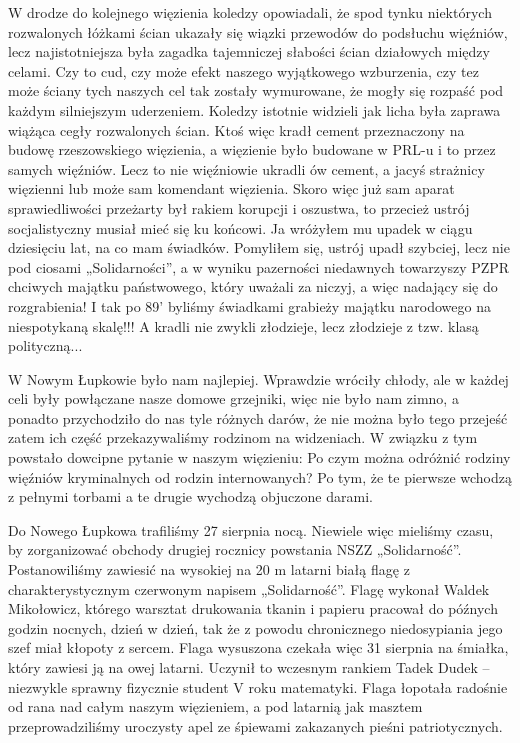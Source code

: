W drodze do kolejnego więzienia koledzy opowiadali, że spod tynku niektórych rozwalonych łóżkami ścian ukazały się wiązki przewodów do podsłuchu więźniów, lecz najistotniejsza była zagadka tajemniczej słabości ścian działowych między celami. Czy to cud, czy może efekt naszego wyjątkowego wzburzenia, czy tez może ściany tych naszych cel tak zostały wymurowane, że mogły się rozpaść pod każdym silniejszym uderzeniem. Koledzy istotnie widzieli jak licha była zaprawa wiążąca cegły rozwalonych ścian. Ktoś więc kradł cement przeznaczony na budowę rzeszowskiego więzienia, a więzienie było budowane w PRL-u i to przez samych więźniów. Lecz to nie więźniowie ukradli ów cement, a jacyś strażnicy więzienni lub może sam komendant więzienia. Skoro więc już sam aparat sprawiedliwości przeżarty był rakiem korupcji i oszustwa, to przecież ustrój socjalistyczny musiał mieć się ku końcowi. Ja wróżyłem mu upadek w ciągu dziesięciu lat, na co mam świadków. Pomyliłem się, ustrój upadł szybciej, lecz nie pod ciosami „Solidarności”, a w wyniku pazerności niedawnych towarzyszy PZPR chciwych majątku państwowego, który uważali za niczyj, a więc nadający się do rozgrabienia! I tak po 89’ byliśmy świadkami grabieży majątku narodowego na niespotykaną skalę!!! A kradli nie zwykli złodzieje, lecz złodzieje z tzw. klasą polityczną...

W Nowym Łupkowie było nam najlepiej. Wprawdzie wróciły chłody, ale w każdej celi były powłączane nasze domowe grzejniki, więc nie było nam zimno, a ponadto przychodziło do nas tyle różnych darów, że nie można było tego przejeść zatem ich część przekazywaliśmy rodzinom na widzeniach. W związku z tym powstało dowcipne pytanie w naszym więzieniu: Po czym można odróżnić rodziny więźniów kryminalnych od rodzin internowanych? Po tym, że te pierwsze wchodzą z pełnymi torbami a te drugie wychodzą objuczone darami.

Do Nowego Łupkowa trafiliśmy 27 sierpnia nocą. Niewiele więc mieliśmy czasu, by zorganizować obchody drugiej rocznicy powstania NSZZ „Solidarność”. Postanowiliśmy zawiesić na wysokiej na 20 m latarni białą flagę z charakterystycznym czerwonym napisem „Solidarność”. Flagę wykonał Waldek Mikołowicz, którego warsztat drukowania tkanin i papieru pracował do późnych godzin nocnych, dzień w dzień, tak że z powodu chronicznego niedosypiania jego szef miał kłopoty z sercem. Flaga wysuszona czekała więc 31 sierpnia na śmiałka, który zawiesi ją na owej latarni. Uczynił to wczesnym rankiem Tadek Dudek – niezwykle sprawny fizycznie student V roku matematyki. Flaga łopotała radośnie od rana nad całym naszym więzieniem, a pod latarnią jak masztem przeprowadziliśmy uroczysty apel ze śpiewami zakazanych pieśni patriotycznych. 

